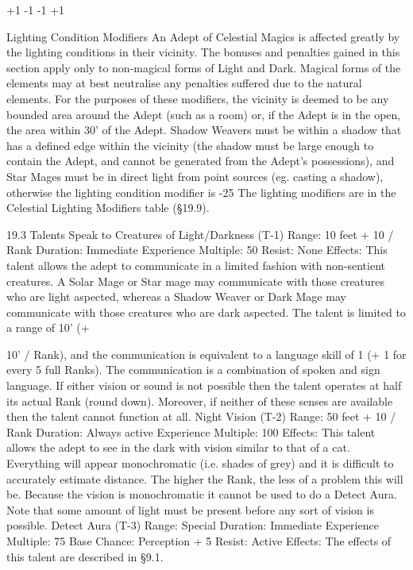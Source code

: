 \documentclass[a4paper]{article}
\begin{document}
\begin{multicols}{3}
+1%
-1%
-1%
+1%

Lighting Condition Modifiers
An Adept of Celestial Magics is affected greatly by
the lighting conditions in their vicinity. The bonuses and penalties gained in this section apply
only to non-magical forms of Light and Dark.
Magical forms of the elements may at best neutralise any penalties suffered due to the natural elements. For the purposes of these modifiers, the
vicinity is deemed to be any bounded area around
the Adept (such as a room) or, if the Adept is in the
open, the area within 30’ of the Adept.
Shadow Weavers must be within a shadow that has
a defined edge within the vicinity (the shadow
must be large enough to contain the Adept, and
cannot be generated from the Adept’s possessions),
and Star Mages must be in direct light from point
sources (eg. casting a shadow), otherwise the lighting condition modifier is -25%
The lighting modifiers are in the Celestial Lighting
Modifiers table (§19.9).

19.3 Talents
Speak to Creatures of Light/Darkness (T-1)
Range: 10 feet + 10 / Rank
Duration: Immediate
Experience Multiple: 50
Resist: None
Effects: This talent allows the adept to communicate in a limited fashion with non-sentient creatures. A Solar Mage or Star mage may communicate with those creatures who are light aspected,
whereas a Shadow Weaver or Dark Mage may
communicate with those creatures who are dark
aspected. The talent is limited to a range of 10’ (+

10’ / Rank), and the communication is equivalent
to a language skill of 1 (+ 1 for every 5 full Ranks).
The communication is a combination of spoken
and sign language. If either vision or sound is not
possible then the talent operates at half its actual
Rank (round down). Moreover, if neither of these
senses are available then the talent cannot function
at all.
Night Vision (T-2)
Range: 50 feet + 10 / Rank
Duration: Always active
Experience Multiple: 100
Effects: This talent allows the adept to see in the
dark with vision similar to that of a cat. Everything
will appear monochromatic (i.e. shades of grey)
and it is difficult to accurately estimate distance.
The higher the Rank, the less of a problem this will
be. Because the vision is monochromatic it cannot
be used to do a Detect Aura. Note that some
amount of light must be present before any sort of
vision is possible.
Detect Aura (T-3)
Range: Special
Duration: Immediate
Experience Multiple: 75
Base Chance: Perception + 5%
Resist: Active
Effects: The effects of this talent are described in
§9.1.


\end{multicols}
\end{document}
